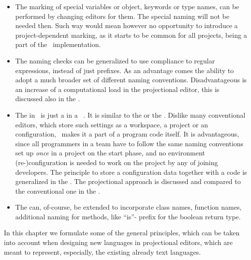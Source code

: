   \begin{itemize}
   \item  The marking of special variables or object, keywords or type names, can be performed by changing editors for them. The special
naming will not be needed then. Such way would mean however no opportunity to introduce a project-dependent marking, as it starts to be
common for all projects, being a part of the \pcpp\ implementation.

\item The naming checks can be generalized to use compliance to regular expressions, instead of just prefixes. As an advantage comes the
ability to adopt a much broader set of different naming conventions. Disadvantageous is an increase
of a computational load in the projectional editor, this is discussed also in the .

\item The  in \pcpp\ is just a  in a \jbmps\ . It is similar to
the  or the  . 
Dislike many conventional editors, which store such settings as a workspace, a project or an  configuration,
\pcpp\ makes it a part of a program code itself. It is advantageous, since all  programmers in a team have to follow the 
same naming conventions set up \emph{once} in a project on the start phase, and no environment 
(re-)configuration is needed to work on the project by
any of  joining developers. The principle to store a configuration data together with a code is generalized in the . 
The projectional approach is discussed and compared to the conventional one in the .

\item The   can, of-course, be extended to incorporate class 
names, function names, additional naming for methods,
like ``is''- prefix for the boolean return type. 


  \end{itemize}

 


In this chapter we formulate some of the general principles, which can be taken into
account when designing new languages in  projectional editors, which are meant to represent, especially,
the existing already text languages.

